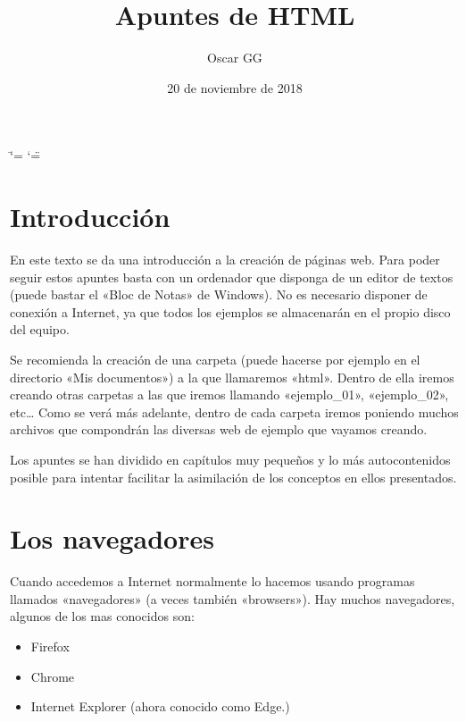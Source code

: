 \documentclass[a4paper,12pt,spanish]{sphinxmanual}
\title{Apuntes de HTML }
\date{20 de noviembre de 2018}
\author{Oscar GG}
\begin{document}
\ifdefined\shorthandoff
  \ifnum\catcode`\=\string=\active\shorthandoff{=}\fi
  \ifnum\catcode`\"=\active{}\fi
\fi

\pagestyle{empty}
\maketitle
\pagestyle{plain}
\sphinxtableofcontents
\pagestyle{normal}
\label{\detokenize{index::doc}}



\chapter{Introducción}
\label{\detokenize{index:introduccion}}
En este texto se da una introducción  a la creación de páginas web. Para poder seguir estos apuntes basta con un ordenador que disponga de un editor de textos (puede bastar el «Bloc de Notas» de Windows). No es necesario disponer de conexión a Internet, ya que todos los ejemplos se almacenarán en el propio disco del equipo.

Se recomienda la creación de una carpeta (puede hacerse por ejemplo en el directorio «Mis documentos») a la que llamaremos «html». Dentro de ella iremos creando otras carpetas a las que iremos llamando «ejemplo\_01», «ejemplo\_02», etc… Como se verá más adelante, dentro de cada carpeta iremos poniendo muchos archivos que compondrán las diversas web de ejemplo que vayamos creando.

Los apuntes se han dividido en capítulos muy pequeños y lo más autocontenidos posible para intentar facilitar la asimilación de los conceptos en ellos presentados.


\chapter{Los navegadores}
\label{\detokenize{index:los-navegadores}}
Cuando accedemos a Internet normalmente lo hacemos usando programas llamados «navegadores» (a veces también «browsers»). Hay muchos navegadores, algunos de los mas conocidos son:
\begin{itemize}
\item {} 
Firefox

\item {} 
Chrome

\item {} 
Internet Explorer (ahora conocido como Edge.)

\end{itemize}
\end{document}
